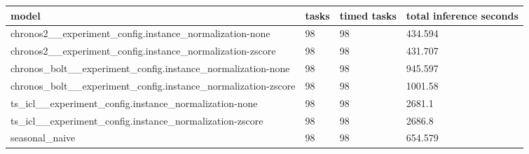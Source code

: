 \begin{tabular}{llll}
\toprule
model & tasks & timed tasks & total inference seconds \\
\midrule
chronos2\_\_experiment\_config.instance\_normalization-none & 98 & 98 & 434.594 \\
chronos2\_\_experiment\_config.instance\_normalization-zscore & 98 & 98 & 431.707 \\
chronos\_bolt\_\_experiment\_config.instance\_normalization-none & 98 & 98 & 945.597 \\
chronos\_bolt\_\_experiment\_config.instance\_normalization-zscore & 98 & 98 & 1001.58 \\
ts\_icl\_\_experiment\_config.instance\_normalization-none & 98 & 98 & 2681.1 \\
ts\_icl\_\_experiment\_config.instance\_normalization-zscore & 98 & 98 & 2686.8 \\
seasonal\_naive & 98 & 98 & 654.579 \\
\bottomrule
\end{tabular}
